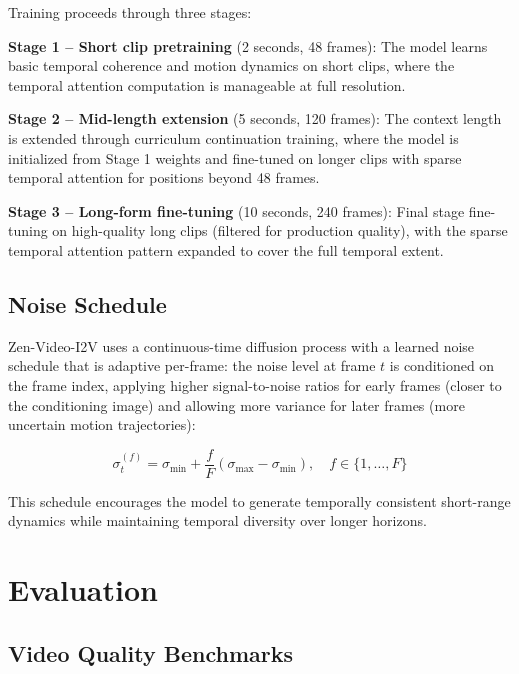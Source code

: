\documentclass[11pt,a4paper]{article}
\begin{document}
Training proceeds through three stages:

\textbf{Stage 1 -- Short clip pretraining} (2 seconds, 48 frames): The model learns basic temporal coherence and motion dynamics on short clips, where the temporal attention computation is manageable at full resolution.

\textbf{Stage 2 -- Mid-length extension} (5 seconds, 120 frames): The context length is extended through curriculum continuation training, where the model is initialized from Stage 1 weights and fine-tuned on longer clips with sparse temporal attention for positions beyond 48 frames.

\textbf{Stage 3 -- Long-form fine-tuning} (10 seconds, 240 frames): Final stage fine-tuning on high-quality long clips (filtered for production quality), with the sparse temporal attention pattern expanded to cover the full temporal extent.

\subsection{Noise Schedule}

Zen-Video-I2V uses a continuous-time diffusion process with a learned noise schedule that is adaptive per-frame: the noise level at frame $t$ is conditioned on the frame index, applying higher signal-to-noise ratios for early frames (closer to the conditioning image) and allowing more variance for later frames (more uncertain motion trajectories):

\begin{equation}
  \sigma_t^{(f)} = \sigma_{\min} + \frac{f}{F}(\sigma_{\max} - \sigma_{\min}), \quad f \in \{1, \ldots, F\}
\end{equation}

This schedule encourages the model to generate temporally consistent short-range dynamics while maintaining temporal diversity over longer horizons.

\section{Evaluation}

\subsection{Video Quality Benchmarks}
\end{document}

